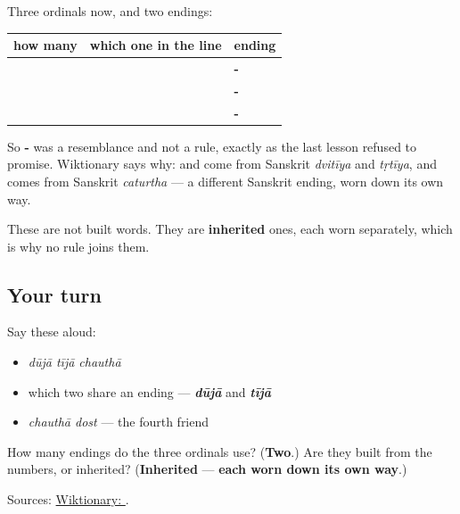 \begin{grammarlens}[title={What you've built}]
Three ordinals now, and two endings:

\noindent
\begin{tabularx}{\linewidth}{@{}>{\raggedright\arraybackslash}X>{\raggedright\arraybackslash}X>{\raggedright\arraybackslash}X@{}}
\toprule
\textbf{how many} & \textbf{which one in the line} & \textbf{ending} \\
\midrule
\textbf{\pa{ਦੋ}} & \textbf{\pa{ਦੂਜਾ}} & \textbf{-\pa{ਜਾ}} \\
\textbf{\pa{ਤਿੰਨ}} & \textbf{\pa{ਤੀਜਾ}} & \textbf{-\pa{ਜਾ}} \\
\textbf{\pa{ਚਾਰ}} & \textbf{\pa{ਚੌਥਾ}} & \textbf{-\pa{ਥਾ}} \\
\bottomrule
\end{tabularx}

So \textbf{-} was a resemblance and not a rule, exactly as the last lesson refused to promise. Wiktionary says why: \textbf{} and \textbf{} come from Sanskrit \emph{dvitīya} and \emph{tṛtīya}, and \textbf{} comes from Sanskrit \emph{caturtha} — a different Sanskrit ending, worn down its own way.

These are not built words. They are \textbf{inherited} ones, each worn separately, which is why no rule joins them.
\end{grammarlens}

\subsection*{Your turn}
Say these aloud:

\begin{itemize}
\raggedright
  \item \emph{dūjā tījā chauthā}
  \item which two share an ending — \emph{\textbf{dūjā}} and \emph{\textbf{tījā}}
  \item \emph{chauthā dost} — the fourth friend
\end{itemize}

\begin{tcolorbox}[breakable,colback=teal!4,colframe=teal!35!black,title={Before you move on}]
How many endings do the three ordinals use? (\textbf{Two}.) Are they built from the numbers, or inherited? (\textbf{Inherited} — \textbf{each worn down its own way}.)

Sources: \href{https://en.wiktionary.org/wiki/\%E0\%A8\%9A\%E0\%A9\%8C\%E0\%A8\%A5\%E0\%A8\%BE}{Wiktionary: }.
\end{tcolorbox}
